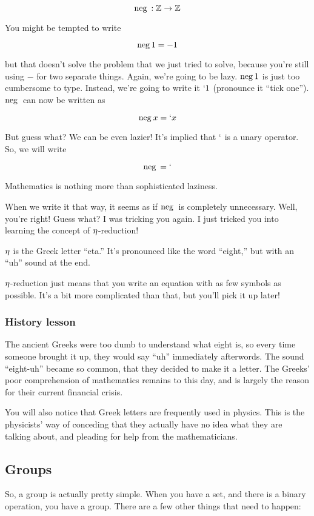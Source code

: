 \[ \mathrm{neg}\hspace{2pt} : \mathbb{Z} \to \mathbb{Z} \]

You might be tempted to write 

\[ \mathrm{neg}\hspace{2pt} 1 = -1 \]

but that doesn't solve the problem that we just tried to solve, because you're
still using $-$ for two separate things. Again, we're going to be lazy. $\mathrm{neg}\hspace{2pt} 1$
is just too cumbersome to type. Instead, we're going to write it $` 1$
(pronounce it ``tick one'').  $\mathrm{neg}\hspace{2pt}$ can now be written as

\[ \mathrm{neg}\hspace{2pt} x = ` x \]

But guess what? We can be even lazier! It's implied that $`$ is a unary
operator. So, we will write

\[ \mathrm{neg}\hspace{2pt} = ` \]

Mathematics is nothing more than sophisticated laziness.

When we write it that way, it seems as if $\mathrm{neg}\hspace{2pt}$ is completely unnecessary. Well,
you're right! Guess what? I was tricking you again. I just tricked you into
learning the concept of $\eta$-reduction! 

$\eta$ is the Greek letter ``eta.'' It's pronounced like the word ``eight,'' but
with an ``uh'' sound at the end. 

$\eta$-reduction just means that you write an equation with as few symbols as
possible. It's a bit more complicated than that, but you'll pick it up later!

\subsubsection{History lesson}

The ancient Greeks were too dumb to understand what eight is, so every time
someone brought it up, they would say ``uh'' immediately afterwords. The sound
``eight-uh'' became so common, that they decided to make it a letter. The
Greeks' poor comprehension of mathematics remains to this day, and is largely
the reason for their current financial crisis.

You will also notice that Greek letters are frequently used in physics. This is
the physicists' way of conceding that they actually have no idea what they are
talking about, and pleading for help from the mathematicians.

\subsection{Groups}

So, a group is actually pretty simple. When you have a set, and there is a
binary operation, you have a group. There are a few other things that need
to happen:

